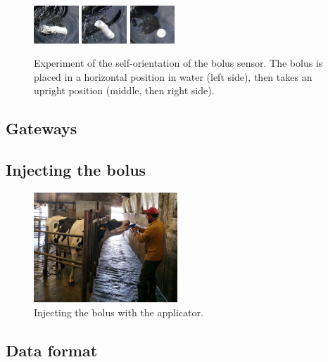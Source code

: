 \documentclass[conference]{IEEEtran}
\begin{document}
\begin{figure}[htbp]
\centerline{
  \includegraphics[width=0.15\textwidth]{fig/kfj_1.png}
  \includegraphics[width=0.15\textwidth]{fig/kfj_2.png}
  \includegraphics[width=0.15\textwidth]{fig/kfj_3.png}
  }
  \caption{Experiment of the self-orientation of the bolus sensor. The
  bolus is placed in a horizontal position in water (left side), then takes
  an upright position (middle, then right side).}
\label{bolus-gw-photo}
\end{figure}

\subsection{Gateways}

\subsection{Injecting the bolus}

\begin{figure}[htbp]
\centerline{\includegraphics[width=0.48\textwidth]{fig/bolus_application.jpg}}
  \caption{Injecting the bolus with the applicator.}
\label{bolus-gw-photo}
\end{figure}


\subsection{Data format}
\end{document}
